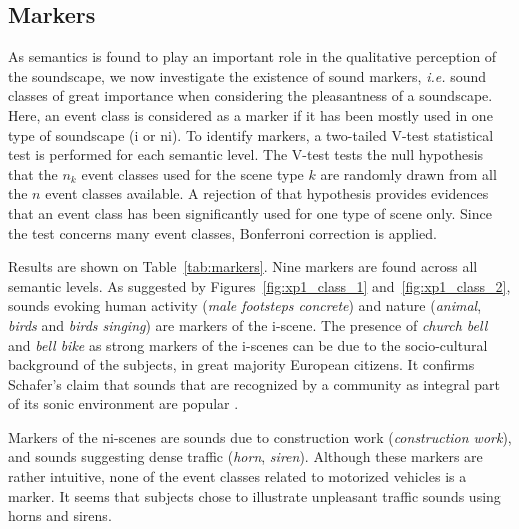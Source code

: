 \documentclass[twoside,twocolumn]{article}
\begin{document}
\subsection{Markers}
\label{sec:markers}

As semantics is found to play an important role in the qualitative perception of the soundscape, we now investigate the existence of sound markers, \textit{i.e.} sound classes of great importance when considering the pleasantness of a soundscape. Here, an event class is considered as a marker if it has been mostly used in one type of soundscape (i or ni). To identify markers, a two-tailed V-test statistical test is performed for each semantic level. The V-test tests the null hypothesis that the $n_k$ event classes used for the scene type $k$ are randomly drawn from all the $n$ event classes available. A rejection of that hypothesis provides evidences that an event class has been significantly used for one type of scene only. Since the test concerns many event classes, Bonferroni correction is applied.

Results are shown on Table~\ref{tab:markers}. Nine markers are found across all semantic levels. As suggested by Figures~\ref{fig:xp1_class_1} and~\ref{fig:xp1_class_2}, sounds evoking human activity (\textit{male footsteps concrete}) and nature (\textit{animal}, \textit{birds} and \textit{birds singing}) are markers of the i-scene. The presence of \textit{church bell} and \textit{bell bike} as strong markers of the i-scenes can be due to the socio-cultural background of the subjects, in great majority European citizens. It confirms Schafer's claim that sounds that are recognized by a community as integral part of its sonic environment are popular \cite{schafer1977tuning}. 

Markers of the ni-scenes are sounds due to construction work (\textit{construction work}), and sounds suggesting dense traffic (\textit{horn}, \textit{siren}). Although these markers are rather intuitive, none of the event classes related to motorized vehicles is a marker. It seems that subjects chose to illustrate unpleasant traffic sounds using horns and sirens.
\end{document}
